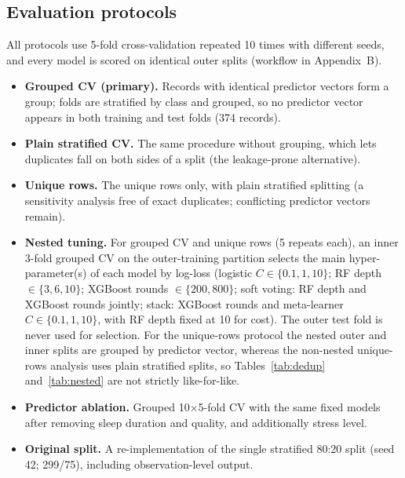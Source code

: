 \documentclass[11pt,a4paper]{article}
\begin{document}
\subsection{Evaluation protocols}\label{sec:eval}
All protocols use 5-fold cross-validation repeated 10 times with different seeds, and every model is scored on identical outer splits (workflow in Appendix~B).
\begin{itemize}
\item \textbf{Grouped CV (primary).} Records with identical predictor vectors form a group; folds are stratified by class and grouped, so no predictor vector appears in both training and test folds (374 records).
\item \textbf{Plain stratified CV.} The same procedure without grouping, which lets duplicates fall on both sides of a split (the leakage-prone alternative).
\item \textbf{Unique rows.} The \NUnique{} unique rows only, with plain stratified splitting (a sensitivity analysis free of exact duplicates; \NConflictVec{} conflicting predictor vectors remain).
\item \textbf{Nested tuning.} For grouped CV and unique rows (5 repeats each), an inner 3-fold grouped CV on the outer-training partition selects the main hyper-parameter(s) of each model by log-loss (logistic $C\in\{0.1,1,10\}$; RF depth $\in\{3,6,10\}$; XGBoost rounds $\in\{200,800\}$; soft voting: RF depth and XGBoost rounds jointly; stack: XGBoost rounds and meta-learner $C\in\{0.1,1,10\}$, with RF depth fixed at 10 for cost). The outer test fold is never used for selection. For the unique-rows protocol the nested outer and inner splits are grouped by predictor vector, whereas the non-nested unique-rows analysis uses plain stratified splits, so Tables~\ref{tab:dedup} and~\ref{tab:nested} are not strictly like-for-like.
\item \textbf{Predictor ablation.} Grouped 10$\times$5-fold CV with the same fixed models after removing sleep duration and quality, and additionally stress level.
\item \textbf{Original split.} A re-implementation of the single stratified 80:20 split (seed 42; 299/75), including observation-level output.
\end{itemize}
\end{document}
